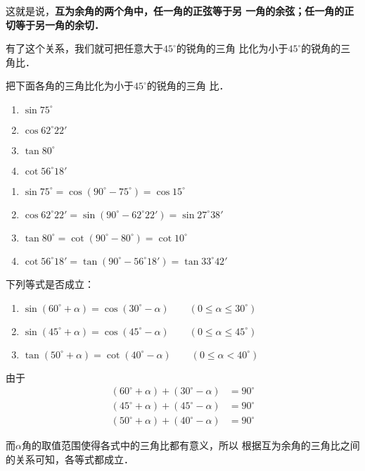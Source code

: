 这就是说，\textbf{互为余角的两个角中，任一角的正弦等于另
一角的余弦；任一角的正切等于另一角的余切．}

有了这个关系，我们就可把任意大于$45^{\circ}$的锐角的三角
比化为小于$45^{\circ}$的锐角的三角比．

\begin{example}
    把下面各角的三角比化为小于$45^{\circ}$的锐角的三角
    比．
\begin{multicols}{2}
\begin{enumerate}
\item $\sin75^{\circ}$
\item $\cos62^{\circ}22'$
\item $\tan 80^{\circ}$
\item $\cot56^{\circ}18'$
\end{enumerate}
\end{multicols}
\end{example}

\begin{solution}
\begin{enumerate}
    \item $\sin75^{\circ}=\cos(90^{\circ}-75^{\circ})=\cos 15^{\circ}$
    \item $\cos62^{\circ}22'=\sin(90^{\circ}-62^{\circ}22')=\sin27^{\circ}38'$
    \item $\tan 80^{\circ}=\cot(90^{\circ}-80^{\circ})=\cot10^{\circ}$
    \item $\cot 56^{\circ}18'=\tan(90^{\circ}-56^{\circ}18')=\tan 33^{\circ}42'$
\end{enumerate}
\end{solution}


\begin{example}
    下列等式是否成立：
\begin{enumerate}
\item $\sin(60^{\circ}+\alpha )=\cos(30^{\circ}-\alpha ) \qquad (0\le \alpha \le 30^{\circ})$
\item $\sin(45^{\circ}+\alpha )=\cos(45^{\circ}-\alpha ) \qquad (0\le \alpha \le 45^{\circ})$
\item $\tan(50^{\circ}+\alpha )=\cot (40^{\circ}-\alpha ) \qquad (0\le \alpha <40^{\circ})$
\end{enumerate}
\end{example}


\begin{solution}
由于
\[\begin{split}
    (60^{\circ}+\alpha )+(30^{\circ}-\alpha )&=90^{\circ}\\
(45^{\circ}+\alpha )+(45^{\circ}-\alpha )&=90^{\circ}\\
(50^{\circ}+\alpha )+(40^{\circ}-\alpha )&=90^{\circ}
\end{split}\]

而$\alpha $角的取值范围使得各式中的三角比都有意义，所以
根据互为余角的三角比之间的关系可知，各等式都成立．
\end{solution}

